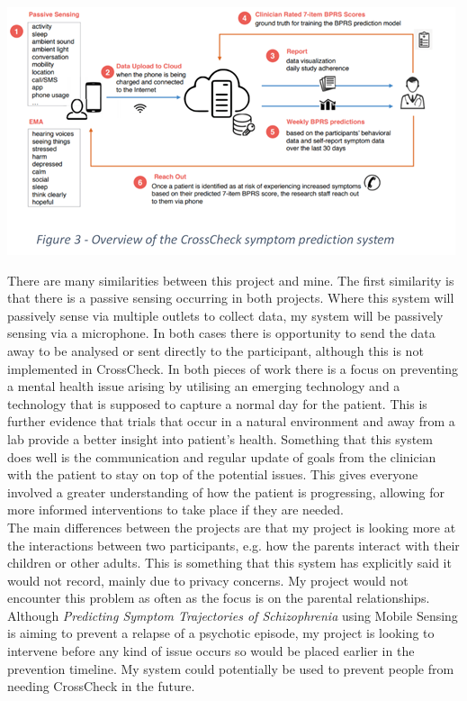 \documentclass[a4paper,11pt]{report}
\begin{document}
\begin{center}
\includegraphics{CrossCheck.PNG}
\end{center}

There are many similarities between this project and mine. The first similarity is that there is a passive sensing occurring in both projects. Where this system will passively sense via multiple outlets to collect data, my system will be passively sensing via a microphone. In both cases there is opportunity to send the data away to be analysed or sent directly to the participant, although this is not implemented in CrossCheck. In both pieces of work there is a focus on preventing a mental health issue arising by utilising an emerging technology and a technology that is supposed to capture a normal day for the patient. This is further evidence that trials that occur in a natural environment and away from a lab provide a better insight into patient’s health. Something that this system does well is the communication and regular update of goals from the clinician with the patient to stay on top of the potential issues. This gives everyone involved a greater understanding of how the patient is progressing, allowing for more informed interventions to take place if they are needed. \\

The main differences between the projects are that my project is looking more at the interactions between two participants, e.g. how the parents interact with their children or other adults. This is something that this system has explicitly said it would not record, mainly due to privacy concerns. My project would not encounter this problem as often as the focus is on the parental relationships. Although \textit{Predicting Symptom Trajectories of Schizophrenia} using Mobile Sensing is aiming to prevent a relapse of a psychotic episode, my project is looking to intervene before any kind of issue occurs so would be placed earlier in the prevention timeline. My system could potentially be used to prevent people from needing CrossCheck in the future.\\
\end{document}
